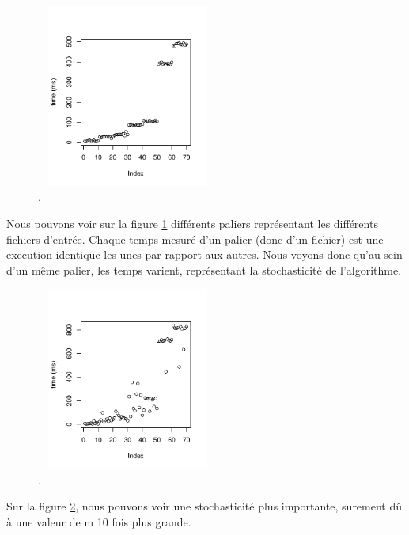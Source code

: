 



\begin{figure}[htbp]
	\begin{center}
		\includegraphics[width=6cm,height=6cm]{diagrams/time_m_10000_k_2.pdf}
		\caption{.}
		\label{fig:timeM10000K2}
	\end{center}
\end{figure}
Nous pouvons voir sur la figure \ref{fig:timeM10000K2} différents paliers représentant les différents fichiers d'entrée.
Chaque temps mesuré d'un palier (donc d'un fichier) est une execution identique les unes par rapport aux autres.
Nous voyons donc qu'au sein d'un même palier, les temps varient, représentant la stochasticité de l'algorithme.

\begin{figure}[htbp]
	\begin{center}
		\includegraphics[width=6cm,height=6cm]{diagrams/time_m_100000_k_2.pdf}
		\caption{.}
		\label{fig:timeM100000K2}
	\end{center}
\end{figure}
Sur la figure \ref{fig:timeM100000K2}, nous pouvons voir une stochasticité plus importante, surement dû à une valeur de m 10 fois plus grande.

